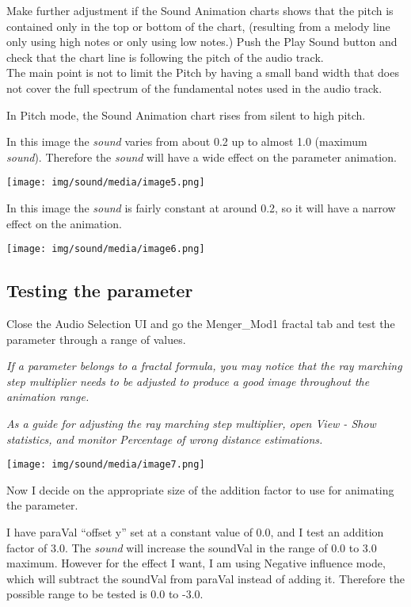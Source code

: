 Make further adjustment if the Sound Animation charts shows that the
pitch is contained only in the top or bottom of the chart, (resulting
from a melody line only using high notes or only using low notes.) Push
the Play Sound button and check that the chart line is following the
pitch of the audio track.\\
The main point is not to limit the Pitch by having a small band width
that does not cover the full spectrum of the fundamental notes used in
the audio track.

In Pitch mode, the Sound Animation chart rises from silent to high pitch.

In this image the \emph{sound} varies from about 0.2 up to almost 1.0
(maximum \emph{sound}). Therefore the \emph{sound} will have a wide
effect on the parameter animation.

\texttt{[image: img/sound/media/image5.png]}

In this image the \emph{sound} is fairly constant at around 0.2, so it
will have a narrow effect on the animation.

\texttt{[image: img/sound/media/image6.png]}

\subsection{Testing the parameter}\label{testing-the-parameter}

Close the Audio Selection UI and go the Menger\_Mod1 fractal tab and
test the parameter through a range of values.

\emph{If a parameter belongs to a fractal formula, you may notice that
the ray marching step multiplier needs to be adjusted to produce a good
image throughout the animation range.}

\emph{As a guide for adjusting the ray marching step multiplier, open
View - Show statistics, and monitor Percentage of wrong distance
estimations.}

\texttt{[image: img/sound/media/image7.png]}

Now I decide on the appropriate size of the addition factor to use for
animating the parameter.

I have paraVal ``offset y'' set at a constant value of 0.0, and I test
an addition factor of 3.0. The \emph{sound} will increase the soundVal
in the range of 0.0 to 3.0 maximum. However for the effect I want, I am
using Negative influence mode, which will subtract the soundVal from
paraVal instead of adding it. Therefore the possible range to be tested
is 0.0 to -3.0.

